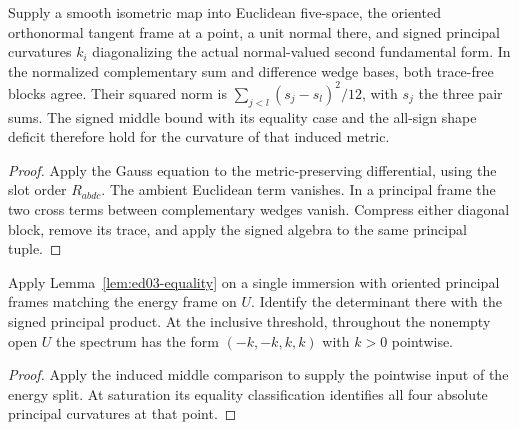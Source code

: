 \begin{proposition}
\label{prop:ed03-induced-block}
\leanok
Supply a smooth isometric map into Euclidean five-space, the oriented
orthonormal tangent frame at a point, a unit normal there, and signed
principal curvatures \(k_i\) diagonalizing the actual normal-valued
second fundamental form. In the normalized complementary sum and
difference wedge bases, both trace-free blocks agree. Their squared norm
is \(\sum_{j<l}(s_j-s_l)^2/12\), with \(s_j\) the three pair sums.
The signed middle bound with its equality case and the all-sign
shape deficit therefore hold for the curvature of that induced metric.
\end{proposition}
\begin{proof}
\leanok
Apply the Gauss equation to the metric-preserving differential, using
the slot order \(R_{abdc}\). The ambient Euclidean term vanishes.
In a principal frame the two cross terms between complementary
wedges vanish. Compress either diagonal block, remove its trace, and
apply the signed algebra to the same principal tuple.
\end{proof}

\begin{corollary}
\label{cor:ed03-balanced-endpoint}
\leanok
Apply Lemma~\ref{lem:ed03-equality} on a single immersion with oriented
principal frames matching the energy frame on \(U\). Identify the determinant
there with the signed principal product. At the inclusive threshold,
throughout the nonempty open \(U\) the spectrum has the form
\((-k,-k,k,k)\) with \(k>0\) pointwise.
\end{corollary}
\begin{proof}
\leanok
Apply the induced middle comparison to supply the pointwise input
of the energy split. At saturation its equality classification identifies
all four absolute principal curvatures at that point.
\end{proof}

